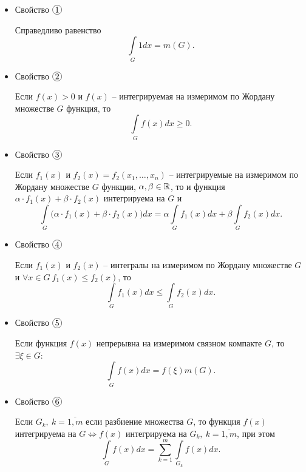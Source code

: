 \begin{itemize}
    \item Свойство $ \circled{1} $
          \begin{statement}
              Справедливо равенство
              \[
                  \underset{G}{\int}1 dx = m(G).
              \]
          \end{statement}

    \item Свойство $ \circled{2} $
          \begin{statement}
              Если $ f(x) > 0 $ и $ f(x) $ -- интегрируемая на измеримом по Жордану множестве $ G $ функция, то
              \[
                  \underset{G}{\int}f(x)dx \geqslant 0.
              \]
          \end{statement}

    \item Свойство $ \circled{3} $
          \begin{statement}
              Если $ f_1(x) $ и $ f_2(x) = f_2(x_1,\ldots,x_n) $ -- интегрируемые на измеримом по Жордану множестве $ G $ функции, $ \alpha,\beta \in \mathbb{R} $, то и функция $ \alpha \cdot f_1(x) + \beta \cdot f_2(x) $ интегрируема на $ G $ и
              \[
                  \underset{G}{\int}\big(\alpha\cdot f_1(x) + \beta \cdot f_2(x)\big)dx = \alpha \underset{G}{\int}f_1(x)dx + \beta \underset{G}{\int}f_2(x)dx.
              \]
          \end{statement}

    \item Свойство $ \circled{4} $
          \begin{statement}
              Если $ f_1(x) $ и $ f_2(x) $ -- интегралы на измеримом по Жордану множестве $ G $ и $ \forall x \in G \ f_1(x) \leqslant f_2(x) $, то
              \[
                  \underset{G}{\int} f_1(x)dx \leqslant \underset{G}{\int}f_2(x)dx.
              \]
          \end{statement}

          \newpage

    \item Свойство $ \circled{5} $
          \begin{statement}
              Если функция $ f(x) $ непрерывна на измеримом связном компакте $ G $, то $ \exists \xi \in G $:
              \[
                  \underset{G}{\int}f(x)dx = f(\xi)m(G).
              \]
          \end{statement}

    \item Свойство $ \circled{6} $
          \begin{statement}
              Если $ G_k, \ k = \overline{1,m} $ если разбиение множества $ G $, то функция $ f(x) $ интегрируема на $ G \iff f(x) $ интегрируема на $ G_k, \ k = \overline{1,m} $, при этом
              \[
                  \underset{G}{\int}f(x)dx = \sum_{k=1}^{m}\underset{G_k}{\int}f(x)dx.
              \]
          \end{statement}


\end{itemize}
